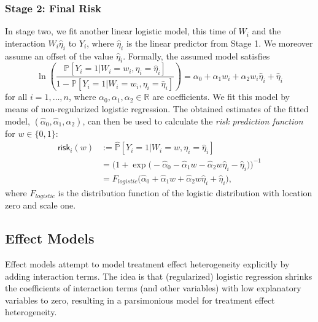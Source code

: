 \documentclass[11pt]{article}
\renewcommand{\P}{\mathbb{P}}
\newcommand{\R}{\mathbb{R}}
\begin{document}
\subsubsection{Stage 2: Final Risk}
In stage two, we fit another linear logistic model, this time of $W_i$ and the interaction $W_i \widehat{\eta}_i$ to $Y_i$, where $\widehat{\eta}_i$ is the linear predictor from Stage 1. We moreover assume an offset of the value $\widehat{\eta}_i$. Formally, the assumed model satisfies 
\begin{equation} \label{eq:stage2-model}
    \ln \left( 
    \frac{ \P[Y_i=1 | W_i = w_i, \eta_i = \widehat{\eta}_i] }{1 - \P[Y_i=1 | W_i = w_i, \eta_i = \widehat{\eta}_i]} \right)
    =
    \alpha_0 + \alpha_1 w_i + \alpha_2 w_i \widehat{\eta}_i + \widehat{\eta}_i 
\end{equation}
for all $i=1,\dots,n$, where $\alpha_0, \alpha_1, \alpha_2 \in \R$ are coefficients. We fit this model by means of non-regularized logistic regression. The obtained estimates of the fitted model, $(\widehat{\alpha}_0, \widehat{\alpha}_1, \widehat{\alpha}_2)$, can then be used to calculate the \textit{risk prediction function} for $w\in\{0,1\}$:
\begin{equation} \label{eq:rm-risk}
\begin{split}
    \textsf{risk}_i(w)
    &:=
    \widehat{\P}[Y_i=1 | W_i = w, \eta_i = \widehat{\eta}_i]\\
    &=
    \Big( 1  +  \exp\big( -\widehat{\alpha}_0 - \widehat{\alpha}_1w - \widehat{\alpha}_2 w\widehat{\eta}_i - \widehat{\eta}_i \big)\Big)^{-1}\\
    &= F_{logistic}\Big(\widehat{\alpha}_0 + \widehat{\alpha}_1w + \widehat{\alpha}_2 w\widehat{\eta}_i + \widehat{\eta}_i\Big),
\end{split}
\end{equation}
where $F_{logistic}$ is the distribution function of the logistic distribution with location zero and scale one. 

\subsection{Effect Models} \label{sec:effect-model}
Effect models attempt to model treatment effect heterogeneity explicitly by adding interaction terms. The idea is that (regularized) logistic regression shrinks the coefficients of interaction terms (and other variables) with low explanatory variables to zero, resulting in a parsimonious model for treatment effect heterogeneity.
\end{document}
